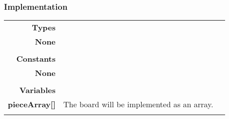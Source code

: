 \documentclass[10pt]{article}
\begin{document}
    \subsubsection{Implementation}
        \begin{tabularx}{\linewidth}{ >{\bfseries}r Xp{5cm} }
            Types           & \begin{tabular}[t]{@{} l p{8cm}} 
                                 & \\
                                None & \\
                            \end{tabular} \\
                            
            Constants       & \begin{tabular}[t]{@{} l p{8cm}} 
                                 & \\
                                None & \\
                            \end{tabular} \\
                              
            Variables       & \begin{tabular}[t]{@{} l p{8cm}} 
                                     & \\
                                    pieceArray[] & The board will be implemented as an array. \\
                              \end{tabular} \\


\end{tabularx}
\end{document}
